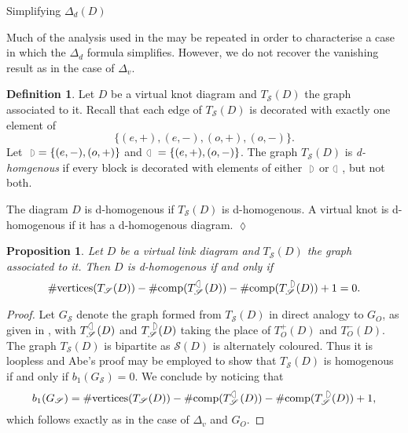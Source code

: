 \documentclass[10pt,oneside]{amsart}
\newtheorem{proposition}[theorem]{Proposition}
\theoremstyle{definition}
\newtheorem{definition}[theorem]{Definition}
\numberwithin{equation}{section}
\DeclareRobustCommand{\CloseDef}{	\leavevmode\unskip\penalty9999 \hbox{}\nobreak\hfill
	\quad\hbox{$\lozenge$}}
\begin{document}
{		{\normalfont\bfseries}}{Simplifying \( \Delta_d ( D ) \)}\label{sec:ddeltazero}

Much of the analysis used in the  may be repeated in order to characterise a case in which the \( \Delta_d \) formula simplifies. However, we do not recover the vanishing result as in the case of \( \Delta_v \).

\begin{definition}
	\label{Def:dhom}
	Let \( D \) be a virtual knot diagram and \( T_{\mathscr{S}} ( D ) \) the graph associated to it. Recall that each edge of \( T_{\mathscr{S}} ( D ) \) is decorated with exactly one element of
	\begin{equation*}
	\lbrace (e,+),(e,-),(o,+),(o,-) \rbrace.
	\end{equation*}
	Let \( \Rightcircle = \lbrace (e,-),(o,+) \rbrace \) and \( \Leftcircle = \lbrace (e,+),(o,-) \rbrace \). The graph \( T_{\mathscr{S}} ( D ) \) is \emph{d-homgenous} if every block is decorated with elements of either \( \Rightcircle \) or \( \Leftcircle \), but not both.

	The diagram \( D \) is d-homogenous if \( T_{\mathscr{S}} ( D ) \) is d-homogenous. A virtual knot is d-homogenous if it has a d-homogenous diagram.\CloseDef
\end{definition}

\begin{proposition}
	\label{Prop:ddelta}
	Let \( D \) be a virtual link diagram and \( T_{\mathscr{S}} ( D ) \) the graph associated to it. Then \( D \) is d-homogenous if and only if
	\begin{equation*}
		\# \text{vertices} ( T_{\mathscr{S}} ( D ) ) - \# \text{comp} ( T^{\Leftcircle}_{\mathscr{S}} ( D ) ) - \# \text{comp} ( T^{\Rightcircle}_{\mathscr{S}} ( D ) ) + 1 = 0.
	\end{equation*}	
\end{proposition}

\begin{proof}
	Let \( G_{\mathscr{S}} \) denote the graph formed from \( T_{\mathscr{S}} ( D ) \) in direct analogy to \( G_O \), as given in , with \( T^{\Leftcircle}_{\mathscr{S}} ( D ) \) and \( T^{\Rightcircle}_{\mathscr{S}} ( D ) \) taking the place of \( T^+_O ( D ) \) and \( T^-_O ( D ) \). The graph \( T_{\mathscr{S}} ( D ) \) is bipartite as \( \mathscr{S} ( D ) \) is alternately coloured. Thus it is loopless and Abe's proof may be employed to show that \( T_{\mathscr{S}} ( D ) \) is homogenous if and only if \( b_1 ( G_{\mathscr{S}} ) = 0 \). We conclude by noticing that
	\begin{equation*}
		b_1 ( G_{\mathscr{S}} ) = \# \text{vertices} ( T_{\mathscr{S}} ( D ) ) - \# \text{comp} ( T^{\Leftcircle}_{\mathscr{S}} ( D ) ) - \# \text{comp} ( T^{\Rightcircle}_{\mathscr{S}} ( D ) ) + 1,
	\end{equation*}
	which follows exactly as in the case of \( \Delta_v \) and \( G_O \).
\end{proof}
\end{document}
